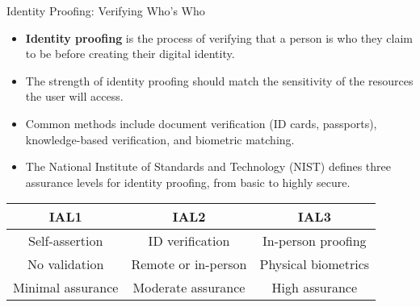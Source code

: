 \documentclass{beamer}
\begin{document}
\begin{frame}{Identity Proofing: Verifying Who's Who}
    \begin{itemize}
        \item \textbf{Identity proofing} is the process of verifying that a person is who they claim to be before creating their digital identity.
        \item The strength of identity proofing should match the sensitivity of the resources the user will access.
        \item Common methods include document verification (ID cards, passports), knowledge-based verification, and biometric matching.
        \item The National Institute of Standards and Technology (NIST) defines three assurance levels for identity proofing, from basic to highly secure.
    \end{itemize}
    
    \begin{center}
        \begin{tabular}{|c|c|c|}
            \hline
            \textbf{IAL1} & \textbf{IAL2} & \textbf{IAL3} \\
            \hline
            Self-assertion & ID verification & In-person proofing \\
            No validation & Remote or in-person & Physical biometrics \\
            Minimal assurance & Moderate assurance & High assurance \\
            \hline
        \end{tabular}
    \end{center}
\end{frame}
\end{document}

